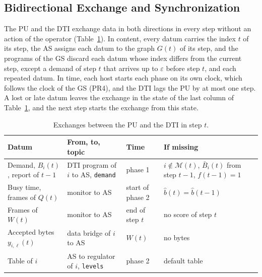 \subsection{Bidirectional Exchange and Synchronization}\label{subsec:exchange}
The PU and the DTI exchange data in both directions in every step without an action of the operator (Table~\ref{tab:exchanges}). In content, every datum carries the index $t$ of its step, the AS assigns each datum to the graph $G(t)$ of its step, and the programs of the GS discard each datum whose index differs from the current step, except a demand of step $t$ that arrives up to $\varepsilon$ before step $t$, and each repeated datum. In time, each host starts each phase on its own clock, which follows the clock of the GS (PR4), and the DTI lags the PU by at most one step. A lost or late datum leaves the exchange in the state of the last column of Table~\ref{tab:exchanges}, and the next step starts the exchange from this state.

\begin{table}[t]
\caption{Exchanges between the PU and the DTI in step $t$.}\label{tab:exchanges}
\centering\footnotesize
\begin{tabular}{@{}p{1.7cm}p{2.0cm}p{1.6cm}p{2.1cm}@{}}
\toprule
Datum & From, to, topic & Time & If missing \\
\midrule
Demand, $B_i(t)$, report of $t-1$ & DTI program of $i$ to AS, \texttt{demand} & phase 1 & $i \notin \mathcal{M}(t)$, $\bar{B}_i(t)$ from step $t-1$, $f(t-1) = 1$ \\
Busy time, frames of $Q(t)$ & monitor to AS & start of phase 2 & $\hat{b}(t) = \hat{b}(t-1)$ \\
Frames of $W(t)$ & monitor to AS & end of step $t$ & no score of step $t$ \\
Accepted bytes $y_{i,\ell}(t)$ & data bridge of $i$ to AS & $W(t)$ & no bytes \\
Table of $i$ & AS to regulator of $i$, \texttt{levels} & phase 2 & default table \\
\bottomrule
\end{tabular}
\end{table}
